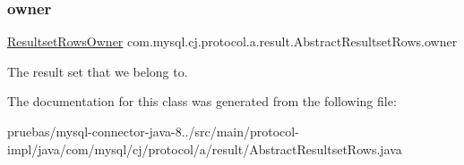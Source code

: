 \subsubsection{\texorpdfstring{owner}{owner}}
{\footnotesize\ttfamily \mbox{\hyperlink{interfacecom_1_1mysql_1_1cj_1_1protocol_1_1_resultset_rows_owner}{Resultset\+Rows\+Owner}} com.\+mysql.\+cj.\+protocol.\+a.\+result.\+Abstract\+Resultset\+Rows.\+owner\hspace{0.3cm}{\ttfamily [protected]}}

The result set that we \textquotesingle{}belong\textquotesingle{} to. 

The documentation for this class was generated from the following file\+:\begin{DoxyCompactItemize}
\item 
pruebas/mysql-\/connector-\/java-\/8../src/main/protocol-\/impl/java/com/mysql/cj/protocol/a/result/Abstract\+Resultset\+Rows.\+java\end{DoxyCompactItemize}
